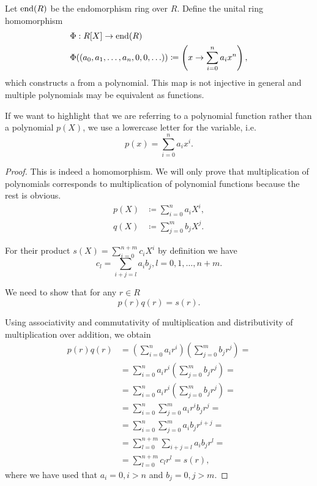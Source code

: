 \begin{definition}\label{def:polynomial_function}
  Let \( \operatorname{end}(R) \) be the endomorphism ring over \( R \). Define the unital ring homomorphism
  \begin{align*}
    &\Phi: R[X] \to \operatorname{end}(R) \\
    &\Phi((a_0, a_1, \ldots, a_n, 0, 0, \ldots)) \coloneqq \left( x \to \sum_{i=0}^n a_i x^n \right),
  \end{align*}
  which constructs a  from a polynomial. This map is not injective in general and multiple polynomials may be equivalent as functions.

  If we want to highlight that we are referring to a polynomial function rather than a polynomial \( p(X) \), we use a lowercase letter for the variable, i.e.
  \begin{equation*}
    p(x) = \sum_{i=0}^n a_i x^i.
  \end{equation*}
\end{definition}
\begin{proof}
  This is indeed a homomorphism. We will only prove that multiplication of polynomials corresponds to multiplication of polynomial functions because the rest is obvious.
  \begin{align*}
    p(X) &\coloneqq \sum_{i=0}^n a_i X^i, \\
    q(X) &\coloneqq \sum_{j=0}^m b_j X^j.
  \end{align*}

  For their product \( s(X) = \sum_{i=0}^{n + m} c_i X^i \) by definition we have
  \begin{equation*}
    c_l = \sum_{i+j=l} a_i b_j, l = 0, 1, \ldots, n + m.
  \end{equation*}

  We need to show that for any \( r \in R \)
  \begin{equation*}
    p(r) q(r) = s(r).
  \end{equation*}

  Using associativity and commutativity of multiplication and distributivity of multiplication over addition, we obtain
  \begin{align*}
    p(r) q(r)
    &=
    \left( \sum_{i=0}^n a_i r^i \right) \left( \sum_{j=0}^m b_j r^j \right)
    = \\ &=
    \sum_{i=0}^n a_i r^i \left( \sum_{j=0}^m b_j r^j \right)
    = \\ &=
    \sum_{i=0}^n a_i r^i \left( \sum_{j=0}^m b_j r^j \right)
    = \\ &=
    \sum_{i=0}^n \sum_{j=0}^m a_i r^i b_j r^j
    = \\ &=
    \sum_{i=0}^n \sum_{j=0}^m a_i b_j r^{i + j}
    = \\ &=
    \sum_{l=0}^{n + m} \sum_{i+j=l} a_i b_j r^l
    = \\ &=
    \sum_{l=0}^{n + m} c_l r^l
    =
    s(r),
  \end{align*}
  where we have used that \( a_i = 0, i > n \) and \( b_j = 0, j > m \).
\end{proof}

